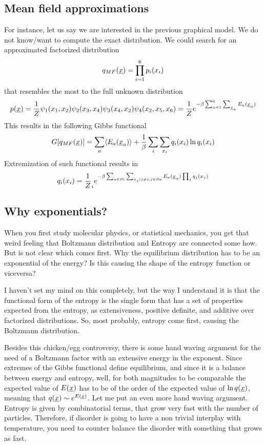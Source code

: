 \subsection{Mean field approximations}
For instance, let us say we are interested in the previous graphical model. We do not know/want to compute the exact distribution. We could search for an approximated factorized distribution
\[ q_{MF}(\underline{x}) = \prod_{i=1}^6 p_i(x_i)\]
that resembles the most to the full unknown distribution
\[ p(\underline{x}) = \frac 1 Z  \psi_1(x_1, x_2) \psi_2(x_3, x_4) \psi_3(x_4, x_2) \psi_4(x_2, x_5,x_6) = \frac 1 Z e^{-\beta \sum_{a=1}^6 \sum_{\underline{x}_a} E_a(\underline{x}_a)}\]
This results in the following Gibbs functional
\[G[q_{MF}(\underline{x})] = \sum_a \langle E_a(\underline{x}_a)\rangle + \frac 1 \beta \sum_i \sum_{x_i} q_i(x_i) \ln q_i(x_i) \]
Extremization of such functional results in
\[q_i(x_i) = \frac 1 Z_i e^{-\beta \sum_{a\in \partial i} \sum_{x_j|j\neq i, j\in\partial a} E_a(\underline{x}_a) \prod_j q_j(x_j)}\]

\subsection*{Why exponentials?}

When you first study molecular physics, or statistical mechanics, you get that weird feeling that Boltzmann distribution and Entropy are connected some how. But is not clear which comes first. Why the equilibrium distribution has to be an exponential of the energy? Is this causing the shape of the entropy function or viceversa?

I haven't set my mind on this completely, but the way I understand it is that the functional form of the entropy is the single form that has a set of properties expected from the entropy, as extensiveness, positive definite, and additive over factorized distributions. So, most probably, entropy come first, causing the Boltzmann distribution.

Besides this chicken/egg controversy, there is some hand waving argument for the need of a Boltzmann factor with an extensive energy in the exponent. Since extremes of the Gibbs functional define equilibrium, and since it is a balance between energy and entropy, well, for both magnitudes to be comparable the expected value of $E(\underline{x})$ has to be of the order of the expected value of $\ln q(\underline{x})$, meaning that $q(\underline{x}) \sim e^{E(\underline{x})}$. Let me put an even more hand waving argument. Entropy is given by combinatorial terms, that grow very fast with the number of particles. Therefore, if disorder is going to have a non trivial interplay with temperature, you need to counter balance the disorder with something that grows as fast.

